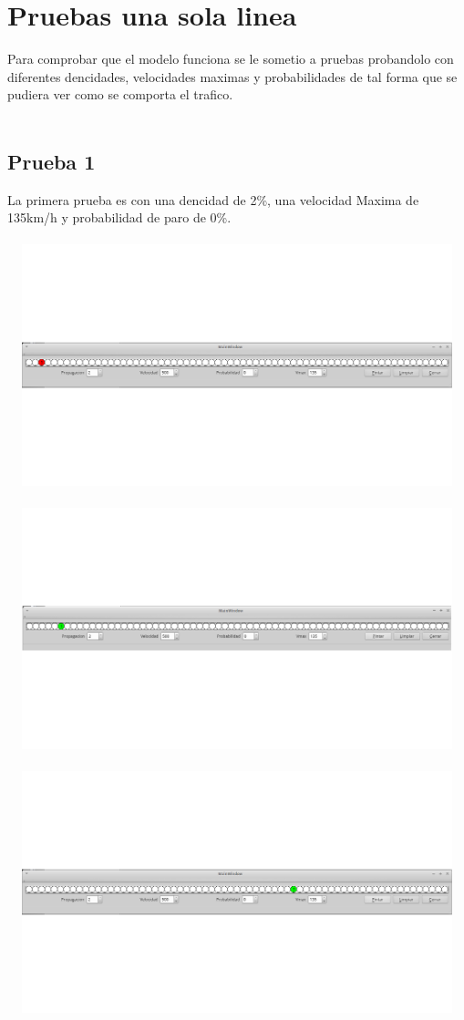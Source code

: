 \documentclass[a4paper,10pt]{article}
\begin{document}
\section{Pruebas una sola linea}
Para comprobar que el modelo funciona se le sometio a pruebas probandolo con diferentes dencidades, velocidades maximas y probabilidades 
de tal forma que se pudiera ver como se comporta el trafico.\\ \\
\subsection{Prueba 1}
La primera prueba es con una dencidad de 2\%, una velocidad Maxima de 135km/h y probabilidad de paro de 0\%.
\\ \\
\includegraphics[width=15cm, height=7cm]{4}
\\ \\
\includegraphics[width=15cm, height=7cm]{5}
\\ \\
\includegraphics[width=15cm, height=7cm]{6}
\end{document}

